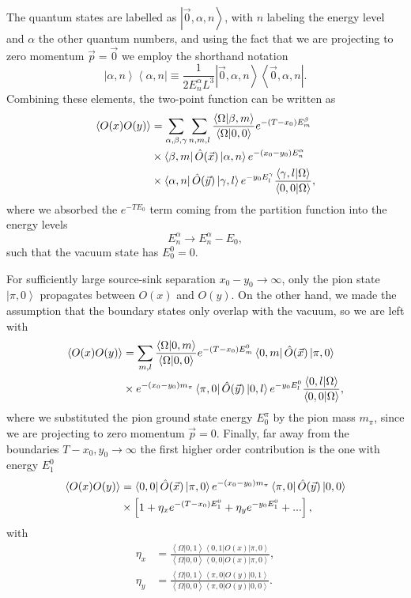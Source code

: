The quantum states are labelled as $\left|\vec{0},\alpha,n\right>$, with $n$ labeling the energy level and $\alpha$ the other quantum numbers, and using the fact that we are projecting to zero momentum $\vec{p}=\vec{0}$ we employ the shorthand notation 
\begin{equation}
\left|\alpha,n\right>\left<\alpha,n\right|\equiv\frac{1}{2E_n^{\alpha}L^3}\left|\vec{0},\alpha,n\right>\left<\vec{0},\alpha,n\right|.
\end{equation}
Combining these elements, the two-point function can be written as
\begin{align}
\left<O(x)O(y)\right>&=\sum_{\alpha,\beta,\gamma}\sum_{n,m,l}\frac{\left<\Omega|\beta,m\right>}{\left<\Omega|0,0\right>}e^{-(T-x_0)E_m^{\beta}} \notag \\
&\times\left<\beta,m\right|\hat{O}(\vec{x})\left|\alpha,n\right>e^{-(x_0-y_0)E_n^{\alpha}} \notag \\
&\times\left<\alpha,n\right|\hat{O}(\vec{y})\left|\gamma,l\right>e^{-y_0E_l^{\gamma}}\frac{\left<\gamma,l|\Omega\right>}{\left<0,0|\Omega\right>},
\end{align}
where we absorbed the $e^{-TE_0}$ term coming from the partition function into the energy levels
\begin{equation}
E_n^{\alpha}\rightarrow E_n^{\alpha}-E_0,
\end{equation}
such that the vacuum state has $E_0^0=0$.

For sufficiently large source-sink separation $x_0-y_0\rightarrow\infty$, only the pion state $\left|\pi,0\right>$ propagates between $O(x)$ and $O(y)$. On the other hand, we made the assumption that the boundary states only overlap with the vacuum, so we are left with
\begin{align}
\left<O(x)O(y)\right>&=\sum_{m,l}\frac{\left<\Omega|0,m\right>}{\left<\Omega|0,0\right>}e^{-(T-x_0)E_m^{0}}\left<0,m\right|\hat{O}(\vec{x})\left|\pi,0\right> \notag \\
&\times e^{-(x_0-y_0)m_{\pi}}\left<\pi,0\right|\hat{O}(\vec{y})\left|0,l\right>e^{-y_0E_l^{0}}\frac{\left<0,l|\Omega\right>}{\left<0,0|\Omega\right>},
\end{align}
where we substituted the pion ground state energy $E^{\pi}_0$ by the pion mass $m_{\pi}$, since we are projecting to zero momentum $\vec{p}=0$. Finally, far away from the boundaries $T-x_0,y_0\rightarrow\infty$ the first higher order contribution is the one with energy $E_1^0$
\begin{align}
\label{ch_foundation:eq:2pt_spec}
\left<O(x)O(y)\right>&=\left<0,0\right|\hat{O}(\vec{x})\left|\pi,0\right>e^{-(x_0-y_0)m_{\pi}}\left<\pi,0\right|\hat{O}(\vec{y})\left|0,0\right> \notag \\
&\times\left[1+\eta_xe^{-(T-x_0)E_1^0}+\eta_ye^{-y_0E_1^0}+...\right],
\end{align}
with 
\begin{align}
\eta_x&=\frac{\left<\Omega|0,1\right>\left<0,1\right|O(x)\left|\pi,0\right>}{\left<\Omega|0,0\right>\left<0,0\right|O(x)\left|\pi,0\right>}, \\
\eta_y&=\frac{\left<\Omega|0,1\right>\left<\pi,0\right|O(y)\left|0,1\right>}{\left<\Omega|0,0\right>\left<\pi,0\right|O(y)\left|0,0\right>}.
\end{align}

